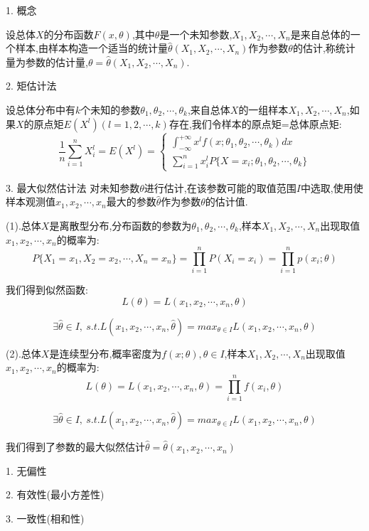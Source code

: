 \begin{definition}[矩估计和最大似然估计]
	1. 概念
	
	设总体$X$的分布函数$F(x,\theta)$,其中$\theta$是一个未知参数,$X_{1},X_{2},\cdots,X_{n}$是来自总体的一个样本,由样本构造一个适当的统计量$\hat{\theta}(X_{1},X_{2},\cdots,X_{n})$作为参数$\theta$的估计,称统计量为参数的估计量,$\theta=\hat{\theta}(X_{1},X_{2},\cdots,X_{n})$.
	
	2. 矩估计法
	
	设总体分布中有$k$个未知的参数$\theta_{1},\theta_{2},\cdots,\theta_{k}$,来自总体$X$的一组样本$X_{1},X_{2},\cdots,X_{n}$,如果$X$的原点矩$E(X^{l})(l=1,2,\cdots,k)$存在,我们令样本的原点矩=总体原点矩: 
	$$\dfrac{1}{n}\sum\limits_{i=1}^{n}X_{i}^{l}=E(X^{l})=\left\lbrace 
	\begin{array}{l}
		\int_{-\infty}^{+\infty}x^{l}f(x;\theta_{1},\theta_{2},\cdots,\theta_{k})dx\\
		\sum\limits_{i=1}^{n}x_{i}^{l}P\{X=x_{i};\theta_{1},\theta_{2},\cdots,\theta_{k}\}
	\end{array}
	\right. $$
	
	3. 最大似然估计法
	对未知参数$\theta$进行估计,在该参数可能的取值范围$I$中选取,使用使样本观测值$x_{1},x_{2},\cdots,x_{n}$最大的参数$\hat{\theta}$作为参数$\theta$的估计值.
	
	(1).总体$X$是离散型分布,分布函数的参数为$\theta_{1},\theta_{2},\cdots,\theta_{k}$,样本$X_{1},X_{2},\cdots,X_{n}$出现取值$x_{1},x_{2},\cdots,x_{n}$的概率为: 
	$$P\{X_{1}=x_{1},X_{2}=x_{2},\cdots,X_{n}=x_{n}\}=\prod\limits_{i=1}^{n}P(X_{i}=x_{i})=\prod\limits_{i=1}^{n}p(x_{i};\theta)$$
	
	我们得到似然函数: 
	$$L(\theta)=L(x_{1},x_{2},\cdots,x_{n},\theta)$$
	
	$$\exists \hat{\theta}\in I,\ s.t. L(x_{1},x_{2},\cdots,x_{n},\hat{\theta})=max_{\theta\in I}L(x_{1},x_{2},\cdots,x_{n},\theta)$$
	
	(2).总体$X$是连续型分布,概率密度为$f(x;\theta),\theta\in I$,样本$X_{1},X_{2},\cdots,X_{n}$出现取值$x_{1},x_{2},\cdots,x_{n}$的概率为: 
	$$L(\theta)=L(x_{1},x_{2},\cdots,x_{n},\theta)=\prod\limits_{i=1}^{n}f(x_{i},\theta)$$
	
	$$\exists \hat{\theta}\in I,\ s.t. L(x_{1},x_{2},\cdots,x_{n},\hat{\theta})=max_{\theta\in I}L(x_{1},x_{2},\cdots,x_{n},\theta)$$
	
	我们得到了参数的最大似然估计$\hat{\theta}=\hat{\theta}(x_{1},x_{2},\cdots,x_{n})$
	\begin{anymark}[估计量的评判标准]
		1. 无偏性
		
		2. 有效性(最小方差性)
		
		3. 一致性(相和性)
	\end{anymark}
\end{definition}
